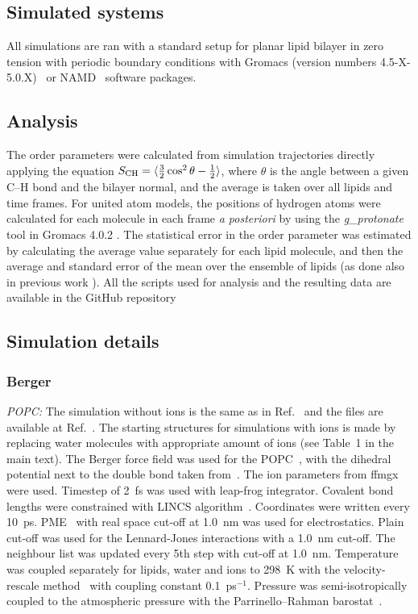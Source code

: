 \documentclass[twoside,twocolumn,9pt]{article}
\begin{document}
\subsection{Simulated systems}
All simulations are ran with a standard setup for planar lipid bilayer in zero tension
with periodic boundary conditions with Gromacs (version numbers 4.5-X-5.0.X)~\cite{pronk13,abraham15} 
or NAMD~\cite{NAMD} software packages.

\subsection{Analysis}
The order parameters were calculated from simulation trajectories directly applying the equation
$S_{{\rm CH}}=\langle \frac{3}{2}  \cos^2 \theta-\frac{1}{2} \rangle$,
where $\theta$ is the angle between a given C--H bond and the bilayer normal, and the average is taken
over all lipids and time frames. For united atom models, the positions of hydrogen atoms
were calculated for each molecule in each frame \textit{a posteriori} by using the {\it g\_protonate} tool in 
Gromacs 4.0.2 \cite{gromacsMANUAL402}. 
The statistical error in the order parameter was estimated by calculating the average value separately for each lipid molecule,
and then the average and standard error of the mean over the ensemble of lipids (as done also in previous work \cite{botan15}).
All the scripts used for analysis and the resulting data are available in the GitHub repository \cite{githubIONpaper}

\subsection{Simulation details}

\subsubsection{Berger}
{\it POPC:} The simulation without ions is the same as in Ref.~ and the files are available at Ref.~. 
The starting structures for simulations with ions is made by replacing water molecules with appropriate amount of ions (see Table~1 in the main text).
The Berger force field was used for the POPC~\cite{berger97}, with the dihedral potential next to the double bond 
taken from~\cite{bachar04}. The ion parameters from ffmgx~\cite{straatsma88} were used.
Timestep of 2~fs was used with leap-frog integrator. Covalent bond lengths were constrained with LINCS algorithm~\cite{hess97,hess07}. 
Coordinates were written every 10~ps. PME~\cite{darden93,essman95} with real space cut-off at 1.0~nm was used 
for electrostatics. Plain cut-off was used for the Lennard-Jones interactions with a 1.0~nm cut-off.
The neighbour list was updated every 5th step with cut-off at 1.0~nm. Temperature was coupled separately
for lipids, water and ions to 298~K with the velocity-rescale method~\cite{bussi07} with coupling constant 0.1~ps$^{-1}$.
Pressure was semi-isotropically coupled to the atmospheric pressure with the Parrinello--Rahman barostat~\cite{parrinello81}.
\end{document}
